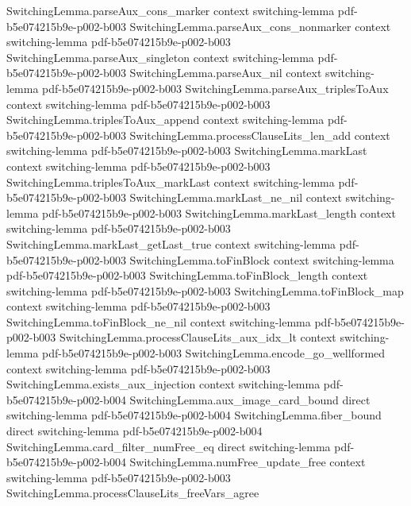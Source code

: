 \begin{theorem}
\proofstep
  {SwitchingLemma.parseAux_cons_marker}
  {context}
  {switching-lemma}
  {pdf-b5e074215b9e-p002-b003}
\proofstep
  {SwitchingLemma.parseAux_cons_nonmarker}
  {context}
  {switching-lemma}
  {pdf-b5e074215b9e-p002-b003}
\proofstep
  {SwitchingLemma.parseAux_singleton}
  {context}
  {switching-lemma}
  {pdf-b5e074215b9e-p002-b003}
\proofstep
  {SwitchingLemma.parseAux_nil}
  {context}
  {switching-lemma}
  {pdf-b5e074215b9e-p002-b003}
\proofstep
  {SwitchingLemma.parseAux_triplesToAux}
  {context}
  {switching-lemma}
  {pdf-b5e074215b9e-p002-b003}
\proofstep
  {SwitchingLemma.triplesToAux_append}
  {context}
  {switching-lemma}
  {pdf-b5e074215b9e-p002-b003}
\proofstep
  {SwitchingLemma.processClauseLits_len_add}
  {context}
  {switching-lemma}
  {pdf-b5e074215b9e-p002-b003}
\proofstep
  {SwitchingLemma.markLast}
  {context}
  {switching-lemma}
  {pdf-b5e074215b9e-p002-b003}
\proofstep
  {SwitchingLemma.triplesToAux_markLast}
  {context}
  {switching-lemma}
  {pdf-b5e074215b9e-p002-b003}
\proofstep
  {SwitchingLemma.markLast_ne_nil}
  {context}
  {switching-lemma}
  {pdf-b5e074215b9e-p002-b003}
\proofstep
  {SwitchingLemma.markLast_length}
  {context}
  {switching-lemma}
  {pdf-b5e074215b9e-p002-b003}
\proofstep
  {SwitchingLemma.markLast_getLast_true}
  {context}
  {switching-lemma}
  {pdf-b5e074215b9e-p002-b003}
\proofstep
  {SwitchingLemma.toFinBlock}
  {context}
  {switching-lemma}
  {pdf-b5e074215b9e-p002-b003}
\proofstep
  {SwitchingLemma.toFinBlock_length}
  {context}
  {switching-lemma}
  {pdf-b5e074215b9e-p002-b003}
\proofstep
  {SwitchingLemma.toFinBlock_map}
  {context}
  {switching-lemma}
  {pdf-b5e074215b9e-p002-b003}
\proofstep
  {SwitchingLemma.toFinBlock_ne_nil}
  {context}
  {switching-lemma}
  {pdf-b5e074215b9e-p002-b003}
\proofstep
  {SwitchingLemma.processClauseLits_aux_idx_lt}
  {context}
  {switching-lemma}
  {pdf-b5e074215b9e-p002-b003}
\proofstep
  {SwitchingLemma.encode_go_wellformed}
  {context}
  {switching-lemma}
  {pdf-b5e074215b9e-p002-b003}
\proofstep
  {SwitchingLemma.exists_aux_injection}
  {context}
  {switching-lemma}
  {pdf-b5e074215b9e-p002-b004}
\proofstep
  {SwitchingLemma.aux_image_card_bound}
  {direct}
  {switching-lemma}
  {pdf-b5e074215b9e-p002-b004}
\proofstep
  {SwitchingLemma.fiber_bound}
  {direct}
  {switching-lemma}
  {pdf-b5e074215b9e-p002-b004}
\proofstep
  {SwitchingLemma.card_filter_numFree_eq}
  {direct}
  {switching-lemma}
  {pdf-b5e074215b9e-p002-b004}
\proofstep
  {SwitchingLemma.numFree_update_free}
  {context}
  {switching-lemma}
  {pdf-b5e074215b9e-p002-b003}
\proofstep
  {SwitchingLemma.processClauseLits_freeVars_agree}

\end{theorem}
